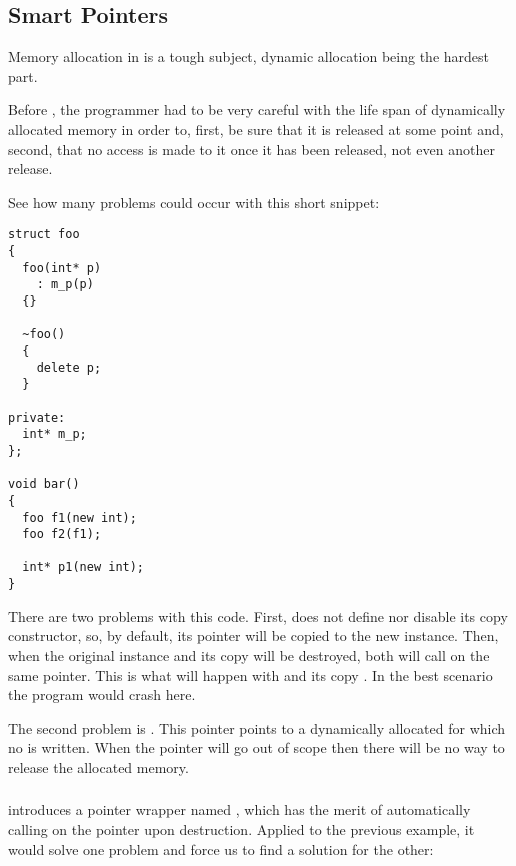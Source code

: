 \subsection{Smart Pointers}

Memory allocation in \cpp{} is a tough subject, dynamic allocation
being the hardest part.

Before , the programmer had to be very careful with the life
span of dynamically allocated memory in order to, first, be sure that
it is released at some point and, second, that no access is made to it
once it has been released, not even another release.

See how many problems could occur with this short snippet:

\begin{lstlisting}
struct foo
{
  foo(int* p)
    : m_p(p)
  {}

  ~foo()
  {
    delete p;
  }

private:
  int* m_p;
};

void bar()
{
  foo f1(new int);
  foo f2(f1);

  int* p1(new int);
}
\end{lstlisting}

There are two problems with this code. First,  does not
define nor disable its copy constructor, so, by default, its
 pointer will be copied to the new instance. Then, when the
original instance and its copy will be destroyed, both will call
 on the same pointer. This is what will happen with
 and its copy . In the best scenario the program
would crash here.

The second problem is . This pointer points to a dynamically
allocated  for which no  is written. When the
pointer will go out of scope then there will be no way to release the
allocated memory.

\subsubsection{}

 introduces a pointer wrapper named ,
which has the merit of automatically calling  on the
pointer upon destruction. Applied to the previous example, it would
solve one problem and force us to find a solution for the other:

